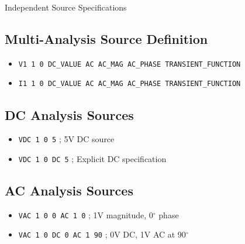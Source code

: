 \documentclass{beamer}
\begin{document}
\begin{frame}{Independent Source Specifications}
    \subsection{Multi-Analysis Source Definition}
    \begin{itemize}
        \item \texttt{V1 1 0 DC\_VALUE AC AC\_MAG AC\_PHASE TRANSIENT\_FUNCTION}
        \item \texttt{I1 1 0 DC\_VALUE AC AC\_MAG AC\_PHASE TRANSIENT\_FUNCTION}
    \end{itemize}
    
    \subsection{DC Analysis Sources}
    \begin{itemize}
        \item \texttt{VDC 1 0 5} ; 5V DC source
        \item \texttt{VDC 1 0 DC 5} ; Explicit DC specification
    \end{itemize}
    
    \subsection{AC Analysis Sources}
    \begin{itemize}
        \item \texttt{VAC 1 0 0 AC 1 0} ; 1V magnitude, 0$^\circ$ phase
        \item \texttt{VAC 1 0 DC 0 AC 1 90} ; 0V DC, 1V AC at 90$^\circ$
    \end{itemize}
\end{frame}
\end{document}
